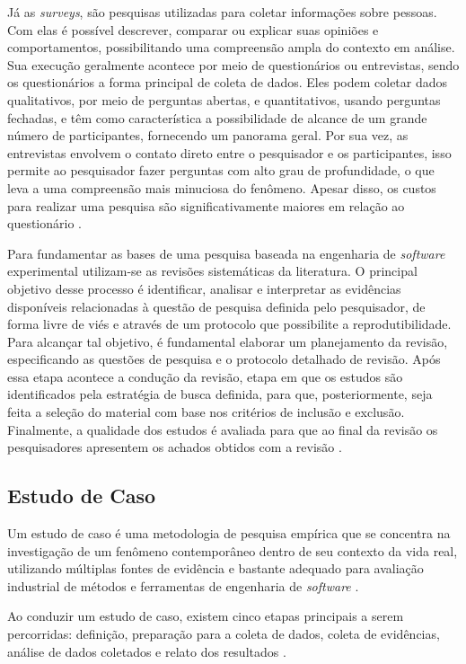 Já as \textit{surveys}, são pesquisas utilizadas para coletar informações sobre pessoas. Com elas é possível descrever, comparar ou explicar suas opiniões e comportamentos, possibilitando uma compreensão ampla do contexto em análise. Sua execução geralmente acontece por meio de questionários ou entrevistas, sendo os questionários a forma principal de coleta de dados. Eles podem coletar dados qualitativos, por meio de perguntas abertas, e quantitativos, usando perguntas fechadas, e têm como característica a possibilidade de alcance de um grande número de participantes, fornecendo um panorama geral.
Por sua vez, as entrevistas envolvem o contato direto entre o pesquisador e os participantes, isso permite ao pesquisador fazer perguntas com alto grau de profundidade, o que leva a uma compreensão mais minuciosa do fenômeno. Apesar disso, os custos para realizar uma pesquisa são significativamente maiores em relação ao questionário \cite{Wohlin2024}.

Para fundamentar as bases de uma pesquisa baseada na engenharia de \textit{software} experimental utilizam-se as revisões sistemáticas da literatura. O principal objetivo desse processo é identificar, analisar e interpretar as evidências disponíveis relacionadas à questão de pesquisa definida pelo pesquisador, de forma livre de viés e através de um protocolo que possibilite a reprodutibilidade. Para alcançar tal objetivo, é fundamental elaborar um planejamento da revisão, especificando as questões de pesquisa e o protocolo detalhado de revisão.
Após essa etapa acontece a condução da revisão, etapa em que os estudos são identificados pela estratégia de busca definida, para que, posteriormente, seja feita a seleção do material com base nos critérios de inclusão e exclusão. Finalmente, a qualidade dos estudos é avaliada para que ao final da revisão os pesquisadores apresentem os achados obtidos com a revisão \cite{Wohlin2024}.

\subsection{Estudo de Caso}

Um estudo de caso é uma metodologia de pesquisa empírica que se concentra na investigação de um fenômeno contemporâneo dentro de seu contexto da vida real, utilizando múltiplas fontes de evidência e bastante adequado para avaliação industrial de métodos e ferramentas de engenharia de \textit{software} \cite{Wohlin2024}.

Ao conduzir um estudo de caso, existem cinco etapas principais a serem percorridas: definição, preparação para a coleta de dados, coleta de evidências, análise de dados coletados e relato dos resultados \cite{yin2015estudo}.

